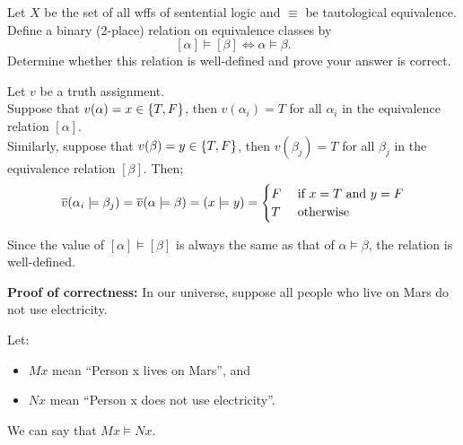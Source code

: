 \begin{problem}[5]
  Let $X$ be the set of all wffs of sentential logic
  and $\equiv$ be tautological equivalence.
  Define a binary (2-place) relation on equivalence classes by
  \[ [\alpha] \models [\beta] \iff \alpha \models \beta. \]
  Determine whether this relation is well-defined
  and prove your answer is correct.
\end{problem}
\begin{Answer}

  \step
  Let $v$ be a truth assignment.\\
  Suppose that $v(\alpha) = x \in \left\{T, F\right\}$, then $v(\alpha_i) = T$ for all $\alpha_i$ in the
  equivalence relation $[\alpha]$.\\
  Similarly, suppose that $v(\beta) = y \in \left\{T, F\right\}$, then $v(\beta_j) = T$ for all $\beta_j$ in the
  equivalence relation $[\beta]$.
  Then;
  \begin{align*}
    \overline{v}(\alpha_i \models \beta_j) = \overline{v}(\alpha \models \beta) = (x \models y) = \begin{cases}
      F & \text{ if } x = T \text{ and } y = F \\
      T & \text{ otherwise }
    \end{cases}
  \end{align*}
  
  \step
  Since the value of $[\alpha] \models [\beta]$
  is always the same as that of $\alpha \models \beta$,
  the relation is well-defined.

  \textbf{Proof of correctness:}
  In our universe, suppose all people who live on Mars do not use electricity.

  \step
  Let:
  \begin{itemize}
    \item $Mx$ mean ``Person x lives on Mars'', and
    \item $Nx$ mean ``Person x does not use electricity''.
  \end{itemize}
  We can say that $Mx \models Nx$.


\end{Answer}
